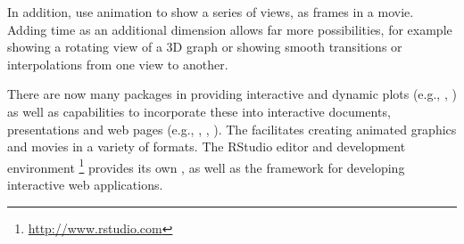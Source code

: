\documentclass[10pt,krantz2]{krantz}\usepackage[]{graphicx}\usepackage[]{color}
\begin{document}
In addition,  use animation to show a series of
views, as frames in a movie.  Adding time as an additional
dimension allows far more possibilities, for example
showing a rotating view of a 3D graph or showing smooth transitions
or interpolations from one view to another.

There are now many packages in \R providing interactive and dynamic plots
(e.g., , )
as well as capabilities to incorporate these into interactive documents,
presentations and web pages (e.g., , , ).
The  facilitates creating animated graphics  and movies in a
variety of formats.
The RStudio editor and development environment%
\footnote{\url{http://www.rstudio.com}}
provides its own
, as well as the  framework for
developing interactive \R web applications.
\end{document}
